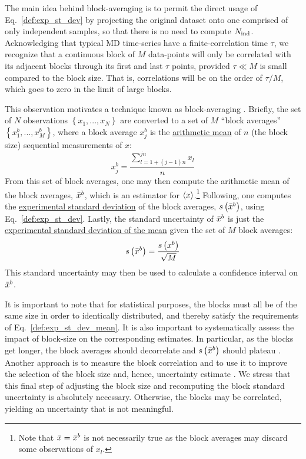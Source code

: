The main idea behind block-averaging is to permit the direct usage of Eq.~\eqref{def:exp_st_dev} by projecting the original dataset onto one comprised of only independent samples, so that there is no need to compute $N_{\rm ind}$.  Acknowledging that typical MD time-series have a finite-correlation time $\tau$, we recognize that a continuous block of $M$ data-points will only be correlated with its adjacent blocks through its first and last $\tau$ points, provided $\tau \ll M$ is small compared to the block size.   That is, correlations will be on the order of $\tau / M$, which goes to zero in the limit of large blocks.

This observation motivates a technique known as block-averaging \cite{Friedberg1970,Flyvbjerg-1989,FrenkelSmit2002,Grossfield2009}.
Briefly, the set of $N$ observations $\left\{x_1, ..., x_N\right\}$ are converted to a set of $M$ ``block averages'' $\left\{x^b_1, ..., x^b_{M}\right\}$, where a block average $x^b_j$ is the \hyperref[def:arith_mean]{arithmetic mean} of $n$ (the block size) sequential measurements of $x$:
%
\begin{equation}
  x^b_j = \dfrac{\sum\limits_{l=1+(j-1)n}^{jn} x_l}{n}
\end{equation}
%
From this set of block averages, one may then compute the arithmetic mean of the block averages, $\bar{x}^b$, which is an estimator for $\langle x \rangle$.\footnote{Note that $\bar{x} = \bar{x}^b$ is not necessarily true as the block averages may discard some observations of $x_l$.}
Following, one computes the \hyperref[def:exp_st_dev]{experimental standard deviation} of the block averages, $s\left( \bar{x}^b \right)$, using Eq.~\ref{def:exp_st_dev}.
Lastly, the standard uncertainty of $\bar{x}^b$ is just the \hyperref[def:exp_st_dev_mean]{experimental standard deviation of the mean} given the set of $M$ block averages:
%
\begin{equation}
  s\left( \bar{x}^b \right) = \dfrac{s\left( x^b \right)}{\sqrt{M}}
\end{equation}
%
This standard uncertainty may then be used to calculate a confidence interval on $\bar{x}^b$.

It is important to note that for statistical purposes, the blocks must all be of the same size in order to identically distributed, and thereby satisfy the requirements of Eq.~\ref{def:exp_st_dev_mean}.  It is also important to  systematically assess the impact of block-size on the corresponding estimates.  In particular, as the blocks get longer, the block averages should decorrelate and $s\left( \bar{x}^b \right)$ should plateau \cite{Flyvbjerg-1989,Grossfield2009}.
Another approach is to measure the block correlation and to use it to improve the selection of the block size and, hence, uncertainty estimate \cite{Kolafa1986}.
We stress that this final step of adjusting the block size and recomputing the block standard uncertainty is absolutely necessary. Otherwise, the blocks may be correlated, yielding an uncertainty that is not meaningful.


